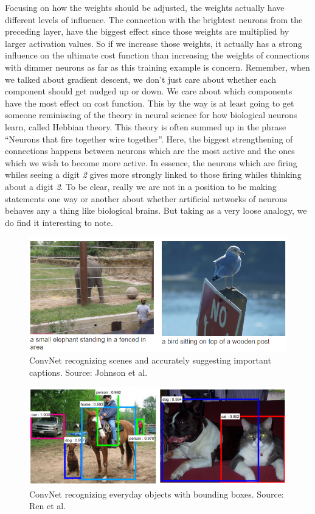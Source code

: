 \documentclass[master]{thesis-uestc}
\begin{document}
Focusing on how the weights should be adjusted, the weights actually have different levels of influence. The connection with the brightest neurons from the preceding layer, have the biggest effect since those weights are multiplied by larger activation values. So if we increase those weights, it actually has a strong influence on the ultimate cost function than increasing the weights of connections with dimmer neurons as far as this training example is concern. Remember, when we talked about gradient descent, we don't just care about whether each component should get nudged up or down. We care about which components have the most effect on cost function. This by the way is at least going to get someone reminiscing of the theory in neural science for how biological neurons learn, called Hebbian theory\cite{Donald1949}. This theory is often summed up in the phrase ``Neurons that fire together wire together''. Here, the biggest strengthening of connections happens between neurons which are the most active and the ones which we wish to become more active. In essence, the neurons which are firing whiles seeing a digit \textit{2} gives more strongly linked to those firing whiles thinking about a digit \textit{2}. To be clear, really we are not in a position to be making statements one way or another about whether artificial networks of neurons behaves any a thing like biological brains. But taking as a very loose analogy, we do find it interesting to note.

\begin{figure}[ht]
\includegraphics[width=5in]{pic/CNN_example.PNG}
\caption{ConvNet recognizing scenes and accurately suggesting important captions. Source: Johnson et al.\cite{densecap}}
\label{cnn_example}
\end{figure}

\begin{figure}[ht]
\includegraphics[width=5in]{pic/everyday_objects.PNG}
\caption{ConvNet recognizing everyday objects with bounding boxes. Source: Ren et al.\cite{DBLP:journals/corr/RenHG015}}
\label{everyday_objects}
\end{figure}
\end{document}
